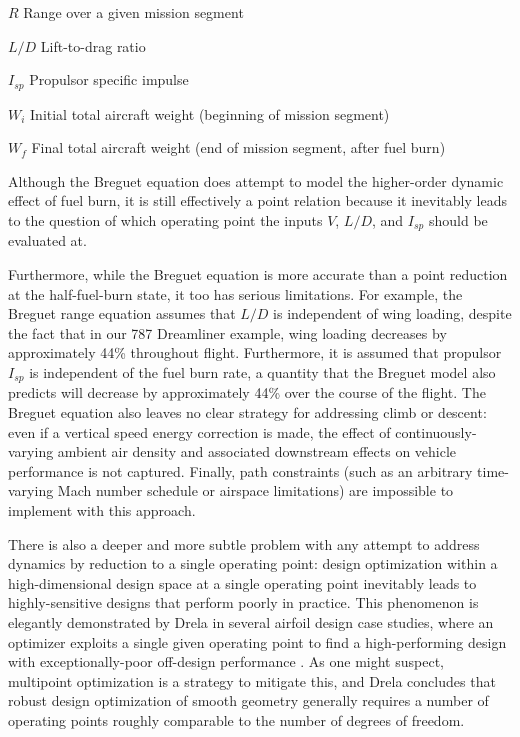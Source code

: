\begin{eqexpl}
    \item{$R$} Range over a given mission segment
    \item{$L/D$} Lift-to-drag ratio
    \item{$I_{sp}$} Propulsor specific impulse
    \item{$W_i$} Initial total aircraft weight (beginning of mission segment)
    \item{$W_f$} Final total aircraft weight (end of mission segment, after fuel burn)
\end{eqexpl}

Although the Breguet equation does attempt to model the higher-order dynamic effect of fuel burn, it is still effectively a point relation because it inevitably leads to the question of which operating point the inputs $V$, $L/D$, and $I_{sp}$ should be evaluated at.

Furthermore, while the Breguet equation is more accurate than a point reduction at the half-fuel-burn state, it too has serious limitations. For example, the Breguet range equation assumes that $L/D$ is independent of wing loading, despite the fact that in our 787 Dreamliner example, wing loading decreases by approximately 44\% throughout flight. Furthermore, it is assumed that propulsor $I_{sp}$ is independent of the fuel burn rate, a quantity that the Breguet model also predicts will decrease by approximately 44\% over the course of the flight. The Breguet equation also leaves no clear strategy for addressing climb or descent: even if a vertical speed energy correction is made, the effect of continuously-varying ambient air density and associated downstream effects on vehicle performance is not captured. Finally, path constraints (such as an arbitrary time-varying Mach number schedule or airspace limitations) are impossible to implement with this approach.

There is also a deeper and more subtle problem with any attempt to address dynamics by reduction to a single operating point: design optimization within a high-dimensional design space at a single operating point inevitably leads to highly-sensitive designs that perform poorly in practice. This phenomenon is elegantly demonstrated by Drela in several airfoil design case studies, where an optimizer exploits a single given operating point to find a high-performing design with exceptionally-poor off-design performance \cite{Drela1998}. As one might suspect, multipoint optimization is a strategy to mitigate this, and Drela concludes that robust design optimization of smooth geometry generally requires a number of operating points roughly comparable to the number of degrees of freedom.

